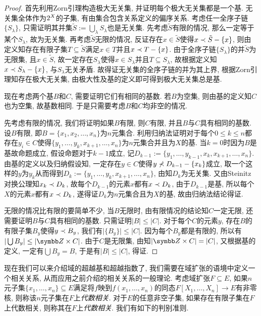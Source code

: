 \begin{proof}
    首先利用Zorn引理构造极大无关集, 并证明每个极大无关集都是一个基. 无关集全体作为$2^{X}$的子集, 有由集合包含关系定义的偏序关系. 考虑任一全序子链$\{S_\lambda\}$, 只需证明其并集$\tilde{S}:=\bigcup_\lambda S_\lambda$也是无关集. 先考虑$\tilde{S}$有限的情况, 那么一定等于某个$S_\lambda$, 故为无关集. 再考虑$\tilde{S}$无限的情况, 反证存在$x\in \tilde{S}$使得$x\prec \tilde{S}-\{x\}$, 则由定义知存在有限子集$T\subseteq\tilde{S}$满足$x\in T$并且$x\prec T-\{x\}$. 由于全序子链$\{S_\lambda\}$的并$\tilde{S}$为无限集, 且$x\in \tilde{S}$, 故一定存在$S_\lambda$使得$x\in S_\lambda$并且$T\subseteq S_\lambda$, 故根据定义知$x\prec S_\lambda-\{x\}$, 与$S_\lambda$无关矛盾. 故得证无关集的全序子链的并为其上界, 根据Zorn引理知存在极大无关集, 由极大性及基的定义即可得到极大无关集总是基.

    现在考虑两个基$B$和$C$, 需要证明它们有相同的基数. 若$B$为空集, 则由基的定义知$C$也为空集, 故基数相同. 于是只需要考虑$B$和$C$均非空的情况.

    先考虑有限的情况, 我们将证明如果$B$有限, 则$C$有限, 并且$B$与$C$具有相同的基数. 设$B$有限, 即$B=\{x_1, x_2, \dotsc, x_n\}$为$n$元集合. 利用归纳法证明对于每个$0\leq k\leq n$都存在$y_i\in C$使得$\{y_1, \dotsc, y_k, x_{k+1}, \dotsc, x_n\}$为$n$元集合并且为$X$的基. 当$k=0$时因为$B$是基故命题成立, 假设命题对于$k-1$成立, 记$D_{k-1}:=\{y_1, \dotsc, y_{k-1}, x_k, x_{k+1}, \dotsc, x_n\}$. 由基的定义以及归纳假设知, 一定存在$y\in C$使得$y\nprec D_{k-1}-\{x_k\}$成立, 取一个这样的$y$为$y_k$从而得到$D_k:=\{y_1, \dotsc, y_k, x_{k+1}, \dotsc, x_n\}$, 由知$D_k$为无关集. 又由Steinitz对换公理知$x_k\prec D_k$, 故每个$D_{k-1}$的元素$x$都有$x\prec D_k$, 由于$D_{k-1}$是基, 所以每个$X$的元素$x$都有$x\prec D_{k}$, 遂得证$D_k$为$n$元集合且为$X$的基, 故由归纳法结论得证.

    无限的情况比有限的要简单不少, 当$B$无限时, 由有限情况的结论知$C$一定无限, 还需要证明$B$与$C$具有相同的基数. 只需证明$\vert B\vert\leq \vert C\vert$. 对于每个$C$的元素$y$, 存在$B$的有限子集$B_y$使得$y\prec B_y$, 我们有$\vert \{B_y\}\vert\leq \vert C\vert$. 因为每个$B_y$都是有限的, 所以有$\vert\bigcup B_y\vert\leq \vert\ZZ\times C\vert$. 由于$C$是无限集, 由知$\vert\ZZ\times C\vert=\vert C\vert$, 又根据基的定义, 一定有$\bigcup B_y=B$, 于是有$\vert B\vert\leq\vert C\vert$, 得证.
\end{proof}

现在我们可以来介绍域的超越基和超越指数了, 我们需要在域扩张的语境中定义一个相关关系, 从而应用之前介绍的相关关系的一般理论. 考虑域扩张$F\subseteq E$, 如果$n$元子集$\{x_1, \dotsc, x_n\}\subseteq E$满足将$f$映到$f(x_1, \dotsc, x_n)$的同态$F[X_1, \dotsc, X_n]\to E$有非零核, 则称该$n$元子集在$F$上\emph{代数相关}. 对于$E$的任意非空子集, 如果存在有限子集在$F$上代数相关, 则称其在$F$上\emph{代数相关}. 我们有如下的判别准则.

